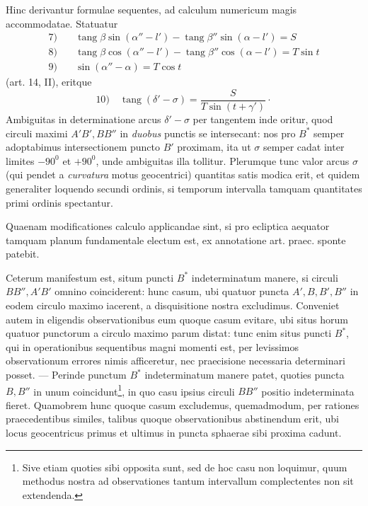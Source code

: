 Hinc derivantur formulae sequentes, ad calculum numericum magis accommodatae. Statuatur
\[
\begin{aligned}
7)\quad&\operatorname{tang}\beta\sin(\alpha''-l')-\operatorname{tang}\beta''\sin(\alpha-l')=S\\[.5ex]
8)\quad&\operatorname{tang}\beta\cos(\alpha''-l')-\operatorname{tang}\beta''\cos(\alpha-l')=T\sin t\\[.5ex]
9)\quad&\sin(\alpha''-\alpha)=T\cos t
\end{aligned}
\]
(art. 14, II), eritque
\[
10)\quad\operatorname{tang}(\delta'-\sigma)=\frac{S}{T\sin(t+\gamma')}\mathpunct{\cdot}
\]
Ambiguitas in determinatione arcus $\delta'-\sigma$ per tangentem inde oritur, quod circuli
maximi $A'B',BB''$ in \emph{duobus} punctis se intersecant: nos pro $B^*$ semper
\hypertarget{native-186}{}adoptabimus intersectionem puncto $B'$ proximam, ita ut $\sigma$ semper cadat inter
limites $-90^0$ et $+90^0$, unde ambiguitas illa tollitur. Plerumque tunc valor
arcus $\sigma$ (qui pendet a \emph{curvatura} motus geocentrici) quantitas satis modica erit,
et quidem generaliter loquendo secundi ordinis, si temporum intervalla tamquam
quantitates primi ordinis spectantur.

Quaenam modificationes calculo applicandae sint, si pro ecliptica aequator
tamquam planum fundamentale electum est, ex annotatione art. praec. sponte
patebit.

Ceterum manifestum est, situm puncti $B^*$ indeterminatum manere, si circuli
$BB'',A'B'$ omnino coinciderent: hunc casum, ubi quatuor puncta $A',B,B',B''$
in eodem circulo maximo iacerent, a disquisitione nostra excludimus.
Conveniet autem in eligendis observationibus eum quoque casum evitare, ubi
situs horum quatuor punctorum a circulo maximo parum distat: tunc enim situs
puncti $B^*$, qui in operationibus sequentibus magni momenti est, per
levissimos observationum errores nimis afficeretur, nec praecisione necessaria
determinari posset. --- Perinde punctum $B^*$ indeterminatum manere patet, quoties
puncta $B,B''$ in unum coincidunt\footnote{Sive etiam quoties sibi opposita sunt, sed de hoc casu non
loquimur, quum methodus nostra ad observationes tantum intervallum
complectentes non sit extendenda.}, in quo casu ipsius circuli $BB''$ positio
indeterminata fieret. Quamobrem hunc quoque casum excludemus, quemadmodum,
per rationes praecedentibus similes, talibus quoque observationibus
abstinendum erit, ubi locus geocentricus primus et ultimus in puncta sphaerae
sibi proxima cadunt.
